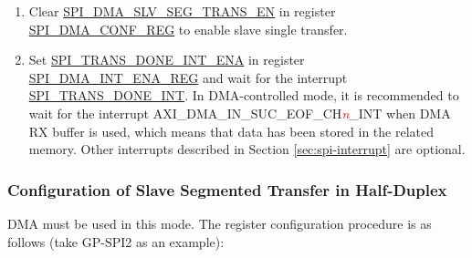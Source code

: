 \documentclass[main\_\_EN.tex]{subfiles}
\begin{document}
\begin{enumerate}
    \item Clear \hyperref[fielddesc:SPIDMASLVSEGTRANSEN]{SPI\_DMA\_SLV\_SEG\_TRANS\_EN}  in register \hyperref[regdesc:SPIDMACONFREG]{SPI\_DMA\_CONF\_REG} to enable slave single transfer.

    \item Set \hyperref[fielddesc:SPITRANSDONEINTENA]{SPI\_TRANS\_DONE\_INT\_ENA} in register \hyperref[regdesc:SPIDMAINTENAREG]{SPI\_DMA\_INT\_ENA\_REG} and wait for the interrupt \hyperref[int:SPITRANSDONEINT]{SPI\_TRANS\_DONE\_INT}. In DMA-controlled mode, it is recommended to wait for the interrupt AXI\_DMA\_IN\_SUC\_EOF\_CH\textcolor{red}{\it{n}}\_INT  when DMA RX buffer is used, which means that data has been stored in the related memory. Other interrupts described in Section \ref{sec:spi-interrupt} are optional.
\end{enumerate}


\subsubsection{Configuration of Slave Segmented Transfer in Half-Duplex}\label{sec:gp-spi2-slave-hd-seg-trans}

DMA must be used in this mode. The register configuration procedure is as follows (take GP-SPI2 as an example):
\end{document}
